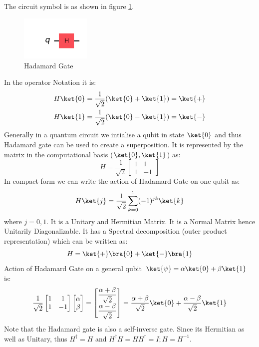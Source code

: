 \documentclass[12pt, oneside]{book}
\theoremstyle{definition}
\theoremstyle{definition}
\theoremstyle{remark}
\begin{document}
The circuit symbol is as shown in figure \ref{fig:hadamard}.
\begin{figure}[H]
    \centering
    \includegraphics[width=0.3\textwidth]{../images/hadamard.png}
    \caption{Hadamard Gate}
    \label{fig:hadamard}
\end{figure}
In the operator Notation it is:
\begin{align*}
    H\ket{0}&=\dfrac{1}{\sqrt{2}}(\ket{0}+\ket{1})=\ket{+} \\
    H\ket{1}&=\dfrac{1}{\sqrt{2}}(\ket{0}-\ket{1})=\ket{-}
\end{align*}
Generally in a quantum circuit we intialise a qubit in state $\ket{0}$ and thus Hadamard gate can be used
to create a superposition. It is represented by the matrix in the computational basis ($\ket{0},\ket{1}$) as:
\[
    H=\dfrac{1}{\sqrt{2}}\begin{bmatrix}
        1 & 1 \\
        1 & -1
    \end{bmatrix}
\]
In compact form we can write the action of Hadamard Gate on one qubit as:
\[
    H\ket{j}=\dfrac{1}{\sqrt{2}}\sum_{k=0}^{1}(-1)^{jk}\ket{k}
\]
where $j=0,1$.
It is a Unitary and Hermitian Matrix. It is a Normal Matrix hence Unitarily Diagonalizable.
It has a Spectral decomposition (outer product representation) which can be written as:
\[
    H=\ket{+}\bra{0}+\ket{-}\bra{1}
\]
Action of Hadamard Gate on a general qubit $\ket{\psi}=\alpha\ket{0}+\beta\ket{1}$ is:
\[
    \dfrac{1}{\sqrt{2}}\begin{bmatrix}
        1 & 1 \\
        1 & -1
    \end{bmatrix}\begin{bmatrix}
        \alpha \\
        \beta
    \end{bmatrix}=\begin{bmatrix}
        \dfrac{\alpha+\beta}{\sqrt{2}} \\
        \dfrac{\alpha-\beta}{\sqrt{2}}
    \end{bmatrix}=\dfrac{\alpha+\beta}{\sqrt{2}}\ket{0}+\dfrac{\alpha-\beta}{\sqrt{2}}\ket{1}
\]
Note that the Hadamard gate is also a self-inverse gate. Since its Hermitian as well as Unitary, thus $H^{\dagger}=H$ and $H^{\dagger}H=HH^{\dagger}=I; H=H^{-1}$.
\end{document}
